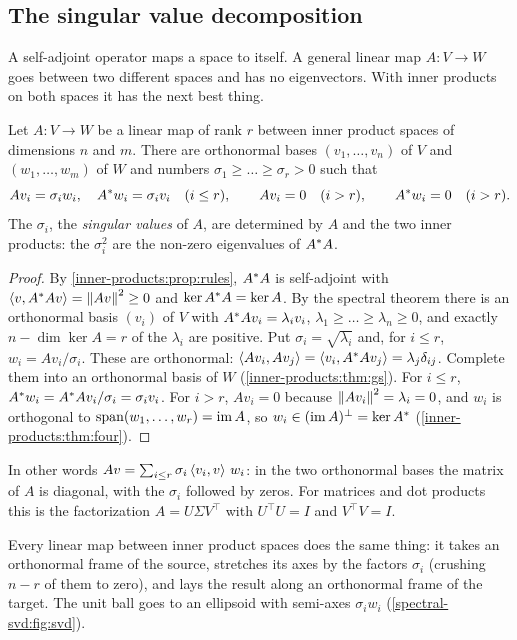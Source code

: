 \begin{notechapter}
\section{The singular value decomposition}\label{spectral-svd:sec:svd}

A self-adjoint operator maps a space to itself. A general linear map
$A:V\to W$ goes between two different spaces and has no eigenvectors. With
inner products on both spaces it has the next best thing.

\begin{theorem}\label{spectral-svd:thm:svd}
Let $A:V\to W$ be a linear map of rank $r$ between inner product spaces of
dimensions $n$ and $m$. There are orthonormal bases $(v_1,\dots,v_n)$ of
$V$ and $(w_1,\dots,w_m)$ of $W$ and numbers
$\sigma_1\geq\dots\geq\sigma_r > 0$ such that
\[
  Av_i = \sigma_iw_i ,\quad A^{*}w_i = \sigma_iv_i \quad(i\leq r),
  \qquad
  Av_i = 0 \quad(i > r), \qquad A^{*}w_i = 0 \quad(i > r) .
\]
The $\sigma_i$, the \emph{singular values} of $A$, are determined by $A$
and the two inner products: the $\sigma_i^2$ are the non-zero eigenvalues
of $A^{*}A$.
\end{theorem}

\begin{proof}
By \cref{inner-products:prop:rules}, $A^{*}A$ is self-adjoint with
$\left\langle v, A^{*}Av \right\rangle = \left\|Av\right\|^2\geq0$ and $\ker A^{*}A = \ker A$. By
the spectral theorem there is an orthonormal basis $(v_i)$ of $V$ with
$A^{*}Av_i = \lambda_iv_i$, $\lambda_1\geq\dots\geq\lambda_n\geq0$, and
exactly $n - \dim\ker A = r$ of the $\lambda_i$ are positive. Put
$\sigma_i = \sqrt{\lambda_i}$ and, for $i\leq r$, $w_i = Av_i/\sigma_i$.
These are orthonormal:
$\left\langle Av_i, Av_j \right\rangle = \left\langle v_i, A^{*}Av_j \right\rangle = \lambda_j\delta_{ij}$.
Complete them into an orthonormal basis of $W$
(\cref{inner-products:thm:gs}). For $i\leq r$,
$A^{*}w_i = A^{*}Av_i/\sigma_i = \sigma_iv_i$. For $i > r$,
$Av_i = 0$ because $\left\|Av_i\right\|^2 = \lambda_i = 0$, and $w_i$ is
orthogonal to $\operatorname{span}(w_1,\dots,w_r) = \operatorname{im} A$, so
$w_i\in(\operatorname{im} A)^\perp = \ker A^{*}$ (\cref{inner-products:thm:four}).
\end{proof}

In other words $Av = \sum_{i\leq r}\sigma_i\left\langle v_i, v \right\rangle\,w_i$: in the two
orthonormal bases the matrix of $A$ is diagonal, with the $\sigma_i$
followed by zeros. For matrices and dot products this is the factorization
$A = U\Sigma V^\top$ with $U^\top U = I$ and $V^\top V = I$.

\begin{intuition}
Every linear map between inner product spaces does the same thing: it
takes an orthonormal frame of the source, stretches its axes by the
factors $\sigma_i$ (crushing $n - r$ of them to zero), and lays the result
along an orthonormal frame of the target. The unit ball goes to an
ellipsoid with semi-axes $\sigma_iw_i$
(\cref{spectral-svd:fig:svd}).
\end{intuition}


\end{notechapter}
